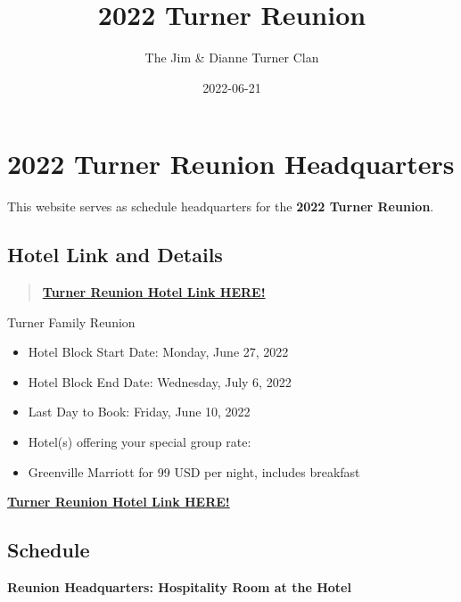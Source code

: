 \documentclass[
]{book}
\title{2022 Turner Reunion}
\author{The Jim \& Dianne Turner Clan}
\date{2022-06-21}
\providecommand{\tightlist}{%
  \setlength{\itemsep}{0pt}\setlength{\parskip}{0pt}}
\begin{document}
\maketitle

{
\setcounter{tocdepth}{1}
\tableofcontents
}
\hypertarget{turner-reunion-headquarters}{%
\chapter*{2022 Turner Reunion Headquarters}\label{turner-reunion-headquarters}}

This website serves as schedule headquarters for the \textbf{2022 Turner Reunion}.

\hypertarget{hotel-link-and-details}{%
\section*{Hotel Link and Details}\label{hotel-link-and-details}}

\begin{quote}
\textbf{\href{https://www.marriott.com/events/start.mi?id=1628261049761\&key=GRP}{Turner Reunion Hotel Link HERE!}}
\end{quote}

Turner Family Reunion

\begin{itemize}
\tightlist
\item
  Hotel Block Start Date: Monday, June 27, 2022
\item
  Hotel Block End Date: Wednesday, July 6, 2022
\item
  Last Day to Book: Friday, June 10, 2022
\item
  Hotel(s) offering your special group rate:
\item
  Greenville Marriott for 99 USD per night, includes breakfast
\end{itemize}

\textbf{\href{https://www.marriott.com/events/start.mi?id=1628261049761\&key=GRP}{Turner Reunion Hotel Link HERE!}}

\hypertarget{schedule}{%
\section*{Schedule}\label{schedule}}

\textbf{Reunion Headquarters: Hospitality Room at the Hotel}
\end{document}
